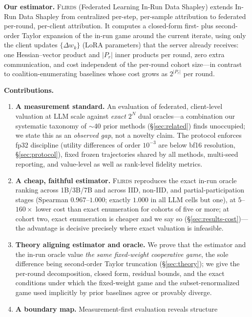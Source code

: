 \textbf{Our estimator.} \textsc{Flirds} (Federated Learning In-Run Data Shapley)
extends In-Run Data Shapley \citep{wang2024irds} from centralized per-step,
per-sample attribution to federated per-round, per-client attribution. It computes
a closed-form first- plus second-order Taylor expansion of the in-run game around
the current iterate, using only the client updates $\{\Delta w_k\}$ (LoRA
parameters) that the server already receives: one Hessian--vector product and
$|P_r|$ inner products per round, zero extra communication, and cost independent
of the per-round cohort size---in contrast to coalition-enumerating baselines whose cost
grows as $2^{|P_r|}$ per round.

\textbf{Contributions.}
\begin{enumerate}[leftmargin=2em, itemsep=2pt]
\item \textbf{A measurement standard.} An evaluation of federated,
client-level valuation at LLM scale against \emph{exact} $2^N$ dual
oracles---a combination our systematic taxonomy of $\sim$40 prior methods
(\S\ref{sec:related}) finds unoccupied; we state this as an \emph{observed
gap}, not a novelty claim. The protocol enforces fp32 discipline (utility
differences of order $10^{-3}$ are below bf16 resolution,
\S\ref{sec:protocol}), fixed frozen trajectories shared by all methods,
multi-seed reporting, and value-level as well as rank-level fidelity metrics.
\item \textbf{A cheap, faithful estimator.} \textsc{Flirds} reproduces the exact
in-run oracle ranking across 1B/3B/7B and across IID, non-IID, and
partial-participation stages (Spearman $0.967$--$1.000$; exactly $1.000$ in all
LLM cells but one), at $5$--$160\times$ lower cost than exact enumeration for
cohorts of five or more; at cohort two, exact enumeration is cheaper and we say
so (\S\ref{sec:results-cost})---the advantage is decisive precisely where exact
valuation is infeasible.
\item \textbf{Theory aligning estimator and oracle.} We prove that the estimator
and the in-run oracle value \emph{the same fixed-weight cooperative game}, the
sole difference being second-order Taylor truncation (\S\ref{sec:theory}); we give
the per-round decomposition, closed form, residual bounds, and the exact
conditions under which the fixed-weight game and the subset-renormalized game
used implicitly by prior baselines agree or provably diverge.
\item \textbf{A boundary map.} Measurement-first evaluation reveals structure

\end{enumerate}

